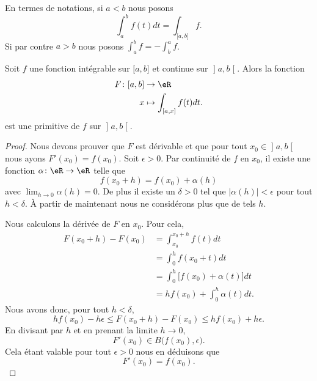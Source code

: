 En termes de notations, si \( a<b\) nous posons
\begin{equation}
    \int_a^bf(t)dt=\int_{\mathopen[ a , b \mathclose]}f.
\end{equation}
Si par contre \( a>b\) nous posons \( \int_a^bf=-\int_b^af\).

\begin{proposition} \label{PropEZFRsMj}
    Soit \( f\) une fonction intégrable sur \( \mathopen[ a , b \mathclose]\) et continue sur \( \mathopen] a , b \mathclose[\). Alors la fonction
    \begin{equation}
        \begin{aligned}
            F\colon \mathopen[ a , b \mathclose]&\to \eR \\
            x&\mapsto \int_{\mathopen[ a , x \mathclose]}f(t)dt.
        \end{aligned}
    \end{equation}
est une primitive de \( f\) sur \( \mathopen] a , b \mathclose[\).
\end{proposition}

\begin{proof}
Nous devons prouver que \( F\) est dérivable et que pour tout \( x_0\in\mathopen] a , b \mathclose[\) nous ayons \( F'(x_0)=f(x_0)\). Soit \( \epsilon>0\). Par continuité de \( f\) en \( x_0\), il existe une fonction \( \alpha\colon \eR\to \eR\) telle que
    \begin{equation}
        f(x_0+h)=f(x_0)+\alpha(h)
    \end{equation}
    avec \( \lim_{h\to 0} \alpha(h)=0\). De plus il existe un \( \delta>0\) tel que \( |\alpha(h)|<\epsilon\) pour tout \( h<\delta\). À partir de maintenant nous ne considérons plus que de tels \( h\).

    Nous calculons la dérivée de \( F\) en \( x_0\). Pour cela,
    \begin{subequations}
        \begin{align}
            F(x_0+h)-F(x_0)&=\int_{x_0}^{x_0+h}f(t)dt\\
        &=\int_0^hf(x_0+t)dt\\
        &=\int_0^h\big[ f(x_0)+\alpha(t) \big]dt\\
        &=hf(x_0)+\int_0^{h}\alpha(t)dt.
        \end{align}
    \end{subequations}
    Nous avons donc, pour tout \( h<\delta\),
    \begin{equation}
        hf(x_0)-h\epsilon\leq F(x_0+h)-F(x_0)\leq hf(x_0)+h\epsilon.
    \end{equation}
    En divisant par \( h\) et en prenant la limite \( h\to 0\),
    \begin{equation}
        F'(x_0)\in B\big( f(x_0),\epsilon \big).
    \end{equation}
    Cela étant valable pour tout \( \epsilon>0\) nous en déduisons que
    \begin{equation}
        F'(x_0)=f(x_0).
    \end{equation}
\end{proof}

